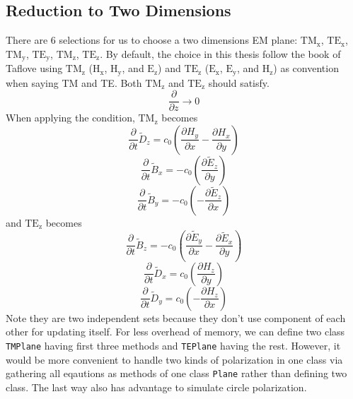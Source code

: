 \subsection{Reduction to Two Dimensions}
There are 6 selections for us to choose a two dimensions EM plane: $\mathrm{TM_{x}} $, $\mathrm{TE_{x}}$,
$\mathrm{TM_{y}}$, $\mathrm{TE_{y}}$, $\mathrm{TM_{z}}$, $\mathrm{TE_{z}}$. By default, the choice in this thesis follow
the book of Taflove using $\mathrm{TM_{z}}$ ($\mathrm{H_x}$, $\mathrm{H_y}$, and $\mathrm{E_z}$) and $\mathrm{TE_{z}}$
($\mathrm{E_x}$, $\mathrm{E_y}$, and $\mathrm{H_z}$) as convention when saying TM and TE. Both $\mathrm{TM_z}$ and
$\mathrm{TE_z}$ should satisfy.
\begin{displaymath}
  \frac{\partial}{\partial z} \rightarrow 0
\end{displaymath}
When applying the condition, $\mathrm{TM_z}$ becomes
\begin{displaymath}
  \frac{\partial}{\partial t}\widetilde{D}_z = c_0\left(\frac{\partial H_y}{\partial x} - \frac{\partial H_x}{\partial y}\right)
\end{displaymath}
\begin{displaymath}
  \frac{\partial}{\partial t}\widetilde{B}_x =-c_0\left(\frac{\partial \widetilde{E}_z}{\partial y}\right)
\end{displaymath}
\begin{displaymath}
  \frac{\partial}{\partial t}\widetilde{B}_y =-c_0\left(- \frac{\partial \widetilde{E}_z}{\partial x}\right)
\end{displaymath}
and $\mathrm{TE_z}$ becomes
\begin{displaymath}
    \frac{\partial}{\partial t}\widetilde{B}_z =-c_0\left(\frac{\partial \widetilde{E}_y}{\partial x} - \frac{\partial \widetilde{E}_x}{\partial y}\right)\label{eq:up_b_z}
\end{displaymath}
\begin{displaymath}
  \frac{\partial}{\partial t}\widetilde{D}_x = c_0\left(\frac{\partial H_z}{\partial y}\right)
\end{displaymath}
\begin{displaymath}
  \frac{\partial}{\partial t}\widetilde{D}_y = c_0\left( - \frac{\partial H_z}{\partial x}\right)
\end{displaymath}
Note they are two independent sets because they don't use component of each other for updating itself. For less overhead
of memory, we can define two class \texttt{TMPlane} having first three methods and \texttt{TEPlane} having the
rest. However, it would be more convenient to handle two kinds of polarization in one class via gathering all eqautions
as methods of one class \texttt{Plane} rather than defining two class. The last way also has advantage to simulate
circle polarization.


